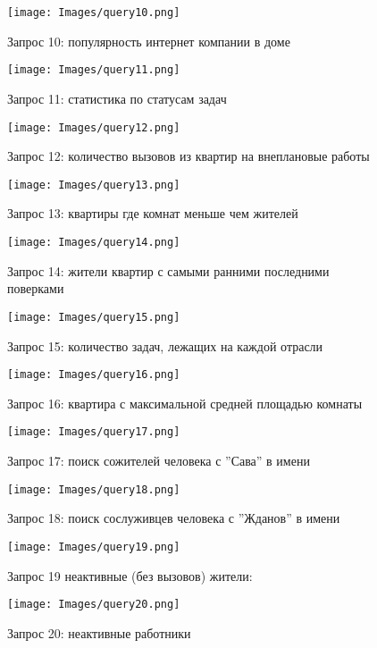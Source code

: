 \begin{figure}[h]
\centering
\texttt{[image: Images/query10.png]}
\caption{Запрос 10: популярность интернет компании в доме}
\end{figure}

\begin{figure}[h]
\centering
\texttt{[image: Images/query11.png]}
\caption{Запрос 11: статистика по статусам задач}
\end{figure}

\begin{figure}[h]
\centering
\texttt{[image: Images/query12.png]}
\caption{Запрос 12: количество вызовов из квартир на внеплановые работы}
\end{figure}

\begin{figure}[h]
\centering
\texttt{[image: Images/query13.png]}
\caption{Запрос 13: квартиры где комнат меньше чем жителей}
\end{figure}

\begin{figure}[h]
\centering
\texttt{[image: Images/query14.png]}
\caption{Запрос 14: жители квартир с самыми ранними последними поверками}
\end{figure}

\begin{figure}[h]
\centering
\texttt{[image: Images/query15.png]}
\caption{Запрос 15: количество задач, лежащих на каждой отрасли}
\end{figure}

\begin{figure}[h]
\centering
\texttt{[image: Images/query16.png]}
\caption{Запрос 16: квартира с максимальной средней площадью комнаты}
\end{figure}

\begin{figure}[h]
\centering
\texttt{[image: Images/query17.png]}
\caption{Запрос 17: поиск сожителей человека с ''Сава'' в имени}
\end{figure}

\begin{figure}[h]
\centering
\texttt{[image: Images/query18.png]}
\caption{Запрос 18:  поиск сослуживцев человека с ''Жданов'' в имени}
\end{figure}

\begin{figure}[h]
\centering
\texttt{[image: Images/query19.png]}
\caption{Запрос 19 неактивные (без вызовов) жители:}
\end{figure}

\begin{figure}[h]
\centering
\texttt{[image: Images/query20.png]}
\caption{Запрос 20: неактивные работники}
\end{figure}